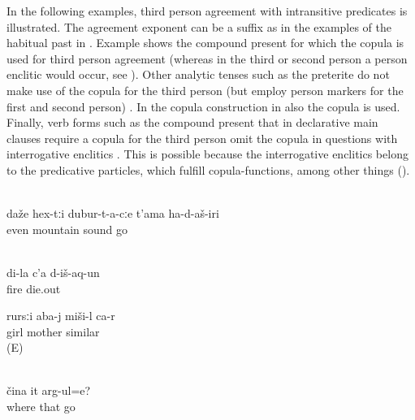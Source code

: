 In the following examples, third person agreement with intransitive predicates is illustrated. The agreement exponent can be a suffix as in the examples of the habitual past in . Example  shows the compound present for which the copula is used for third person agreement (whereas in the third or second person a person enclitic would occur, see ). Other analytic tenses such as the preterite do not make use of the copula for the third person (but employ person markers for the first and second person) . In the copula construction in  also the copula is used. Finally, verb forms such as the compound present that in declarative main clauses require a copula for the third person omit the copula in questions with interrogative enclitics . This is possible because the  interrogative enclitics belong to the predicative particles, which fulfill copula-functions, among other things ().
%
\begin{exe}
		\\	\label{ex:‎The sound went even to the mountains habitual past}
		\gll	daže	hex-tːi	dubur-t-a-cːe	t'ama	ha-d-aš-iri\\
			even		mountain	sound	go\\
		\glt	{}
		
				\\	\label{ex:My fire died out preterite}
		\gll	di-la	c'a	d-iš-aq-un\\
				fire	die.out\\
		\glt	{}
		
			\ex	\label{ex:The daughter is similar to her mother}
	\gll	rursːi	aba-j	miši-l ca-r\\
		girl	mother	similar \\
	\glt	{} (E)
		
		\\	\label{ex:Where is s/he going compound present}
		\gll	čina	it	arg-ul=e?\\
			where	that	go\\
		\glt	{}
\end{exe}

